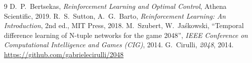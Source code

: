 \documentclass[11pt,a4paper]{article}
\theoremstyle{remark}
\begin{document}
\begin{thebibliography}{9}
 D.~P.~Bertsekas, \emph{Reinforcement Learning and Optimal Control}, Athena Scientific, 2019.
 R.~S.~Sutton, A.~G.~Barto, \emph{Reinforcement Learning: An Introduction}, 2nd ed., MIT Press, 2018.
 M.~Szubert, W.~Ja\'{s}kowski, ``Temporal difference learning of N-tuple networks for the game 2048'', \emph{IEEE Conference on Computational Intelligence and Games (CIG)}, 2014.
 G.~Cirulli, \emph{2048}, 2014. \url{https://github.com/gabrielecirulli/2048}
\end{thebibliography}
\end{document}
